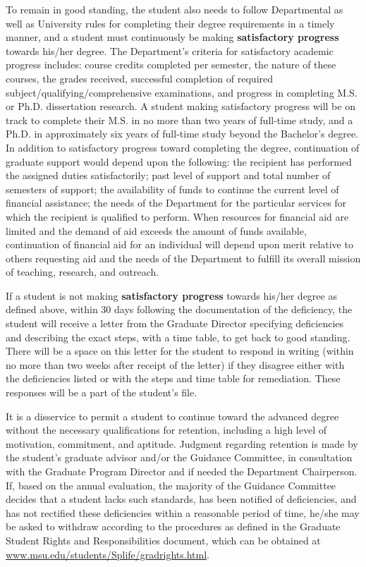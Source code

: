 To remain in good standing, the student also needs to follow
Departmental as well as University rules for completing their degree
requirements in a timely manner, and a student must continuously be
making \textbf{satisfactory progress} towards his/her degree.  The
Department's criteria for satisfactory academic progress includes:
course credits completed per semester, the nature of these courses,
the grades received, successful completion of required
subject/qualifying/comprehensive examinations, and progress in
completing M.S. or Ph.D. dissertation research.  A student making
satisfactory progress will be on track to complete their M.S. in no more than two years of full-time study,
and a Ph.D. in approximately six years of full-time study beyond the
Bachelor's degree.  In addition to
satisfactory progress toward completing the degree, continuation of
graduate support would depend upon the following: the recipient has
performed the assigned duties satisfactorily; past level of support
and total number of semesters of support; the availability of funds to
continue the current level of financial assistance; the needs of the
Department for the particular services for which the recipient is
qualified to perform.  When resources for financial aid are limited
and the demand of aid exceeds the amount of funds available,
continuation of financial aid for an individual will depend upon merit
relative to others requesting aid and the needs of the Department to
fulfill its overall mission of teaching, research, and outreach.  
 
If a student is not making \textbf{satisfactory progress} towards
his/her degree as defined above, within 30 days following the
documentation of the deficiency, the student will receive a letter
from the Graduate Director specifying deficiencies and describing the
exact steps, with a time table, to get back to good standing.  There
will be a space on this letter for the student to respond in writing
(within no more than two weeks after receipt of the letter)
if they disagree either with the deficiencies listed or with the steps
and time table for remediation. These responses will be a part of the
student's file.

It is a disservice to permit a student to continue toward the advanced
degree without the necessary qualifications for retention, including a
high level of motivation, commitment, and aptitude.  Judgment
regarding retention is made by the student's graduate advisor and/or
the Guidance Committee, in consultation with the Graduate Program
Director and if needed the Department Chairperson.  If, based on the
annual evaluation, the majority of the Guidance Committee decides that a
student lacks such standards, has been notified of deficiencies, and
has not rectified these deficiencies within a reasonable period of
time,
 he/she may be asked to withdraw
according to the procedures as defined in the Graduate Student Rights
and Responsibilities document, which can be obtained at
\url{www.msu.edu/students/Splife/gradrights.html}.

